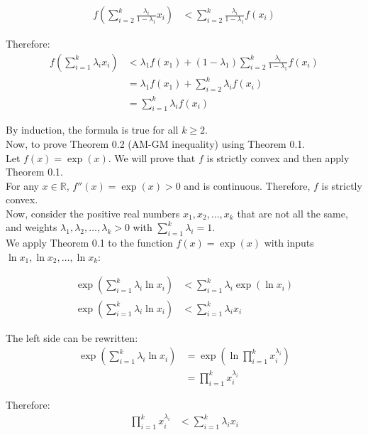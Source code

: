 \documentclass{article}
\begin{document}
\begin{align*}
f\left(\sum_{i=2}^{k} \frac{\lambda_i}{1 - \lambda_1} x_i\right) &< \sum_{i=2}^{k} \frac{\lambda_i}{1 - \lambda_1} f(x_i)
\end{align*}

Therefore:
\begin{align*}
f\left(\sum_{i=1}^{k} \lambda_i x_i\right) &< \lambda_1 f(x_1) + (1 - \lambda_1)\sum_{i=2}^{k} \frac{\lambda_i}{1 - \lambda_1} f(x_i)\\
&= \lambda_1 f(x_1) + \sum_{i=2}^{k} \lambda_i f(x_i)\\
&= \sum_{i=1}^{k} \lambda_i f(x_i)
\end{align*}

By induction, the formula is true for all $k \geq 2$. \\

Now, to prove Theorem 0.2 (AM-GM inequality) using Theorem 0.1. \\

Let $f(x) = \exp(x)$. We will prove that $f$ is strictly convex and then apply Theorem 0.1. \\

For any $x \in \mathbb{R}$, $f''(x) = \exp(x) > 0$ and is continuous. Therefore, $f$ is strictly convex. \\

Now, consider the positive real numbers $x_1, x_2, \ldots, x_k$ that are not all the same, and weights $\lambda_1, \lambda_2, \ldots, \lambda_k > 0$ with $\sum_{i=1}^{k} \lambda_i = 1$. \\

We apply Theorem 0.1 to the function $f(x) = \exp(x)$ with inputs $\ln x_1, \ln x_2, \ldots, \ln x_k$:

\begin{align*}
\exp\left(\sum_{i=1}^{k} \lambda_i \ln x_i\right) &< \sum_{i=1}^{k} \lambda_i \exp(\ln x_i)\\
\exp\left(\sum_{i=1}^{k} \lambda_i \ln x_i\right) &< \sum_{i=1}^{k} \lambda_i x_i
\end{align*}

The left side can be rewritten:
\begin{align*}
\exp\left(\sum_{i=1}^{k} \lambda_i \ln x_i\right) &= \exp\left(\ln\prod_{i=1}^{k} x_i^{\lambda_i}\right)\\
&= \prod_{i=1}^{k} x_i^{\lambda_i}
\end{align*}

Therefore:
\begin{align*}
\prod_{i=1}^{k} x_i^{\lambda_i} &< \sum_{i=1}^{k} \lambda_i x_i
\end{align*}
\end{document}
